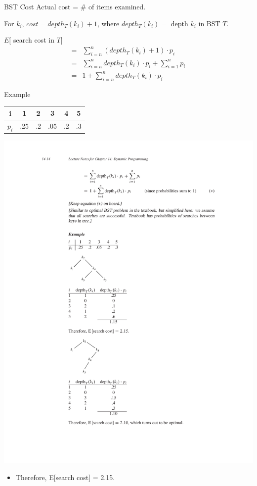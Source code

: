 \documentclass{beamer}
\begin{document}
\begin{frame}{BST Cost}
    Actual cost = \# of items examined.
    \begin{center}
        \footnotesize
        For $k_i$, $cost = depth_T (k_i) + 1$, where $depth_T (k_i) =$ depth $k_i$ in BST $T$.
    \end{center}
    $E[$ search cost in $T]$
    \begin{equation*}
        \begin{align*}
            =& \sum_{i=n}^{n} (depth_T(k_i) + 1) \cdot p_i \\
            =& \sum_{i=n}^{n} depth_T(k_i) \cdot p_i + \sum_{i=1}^{n} p_i \\
            =& 1 + \sum_{i=n}^{n} depth_T(k_i) \cdot p_i
        \end{align*}
    \end{equation*}
\end{frame}

\begin{frame}{Example}
    \centering
    \begin{tabular}{c | c c c c c}
        i & 1 & 2 & 3 & 4 & 5 \\
        \hline
        $p_i$ & .25 & .2 & .05 & .2 & .3
    \end{tabular}
    \includegraphics[width=\textwidth, trim={4cm 12cm 4cm 9.75cm}, clip]{figures/BST_example}
    \begin{itemize}
        \item Therefore, E[search cost] = 2.15.
    \end{itemize}
\end{frame}
\end{document}

